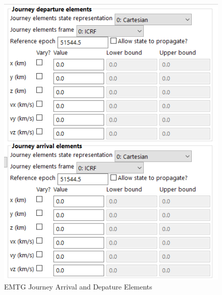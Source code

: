     \begin{figure}[H]
        \centering
        \includegraphics{../../shared_latex_inputs/images/pyemtg_journey_deparr_elements.png}
        \caption{EMTG Journey Arrival and Depature Elements}
        \label{fig:pyemtg_journey_deparr_elements}
    \end{figure}




